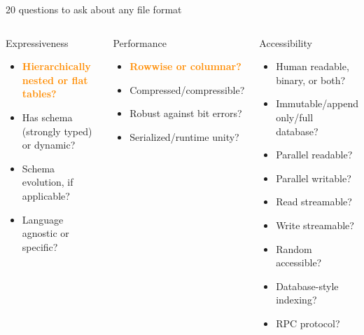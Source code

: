 \documentclass[aspectratio=169]{beamer}
\begin{document}
\begin{frame}{20 questions to ask about any file format}
\vspace{0.15 cm}
\small
\begin{columns}

\begin{block}{Expressiveness}
\vspace{-0.2 cm}
\begin{itemize}\setlength{\itemsep}{-0.05 cm}
\item \textcolor{darkorange}{\bf Hierarchically nested or flat tables?}
\item Has schema (strongly typed) or dynamic?
\item Schema evolution, if applicable?
\item Language agnostic or specific?
\end{itemize}
\end{block}

\vspace{0.5 cm}

\begin{block}{Performance}
\vspace{-0.2 cm}
\begin{itemize}\setlength{\itemsep}{-0.05 cm}
\item \textcolor{darkorange}{\bf Rowwise or columnar?}
\item Compressed/compressible?
\item Robust against bit errors?
\item Serialized/runtime unity?
\end{itemize}
\end{block}


\begin{block}{Accessibility}
\vspace{-0.2 cm}
\begin{itemize}\setlength{\itemsep}{-0.05 cm}
\item Human readable, binary, or both?
\item Immutable/append only/full database?
\item Parallel readable?
\item Parallel writable?
\item Read streamable?
\item Write streamable?
\item Random accessible?
\item Database-style indexing?
\item RPC protocol?
\end{itemize}
\end{block}


\end{columns}
\end{frame}
\end{document}

